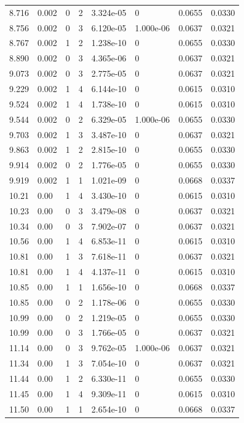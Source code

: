 \documentclass[preview]{standalone}
\begin{document}
{{{\begin{tabular}{L{1.2cm}C{1.2cm} C{0.3cm}C{0.5cm} C{1.4cm}C{1.4cm} C{1.4cm}C{1.4cm}}
  8.716  &  0.002  & 0     &  2 &  3.324e-05  & 0  & 0.0655 &  0.0330   \\ 
  8.756  &  0.002  & 0     &  3 &  6.120e-05  & 1.000e-06  & 0.0637 &  0.0321   \\ 
  8.767  &  0.002  & 1     &  2 &  1.238e-10  & 0  & 0.0655 &  0.0330   \\ 
  8.890  &  0.002  & 0     &  3 &  4.365e-06  & 0  & 0.0637 &  0.0321   \\ 
  9.073  &  0.002  & 0     &  3 &  2.775e-05  & 0  & 0.0637 &  0.0321   \\ 
  9.229  &  0.002  & 1     &  4 &  6.144e-10  & 0  & 0.0615 &  0.0310   \\ 
  9.524  &  0.002  & 1     &  4 &  1.738e-10  & 0  & 0.0615 &  0.0310   \\ 
  9.544  &  0.002  & 0     &  2 &  6.329e-05  & 1.000e-06  & 0.0655 &  0.0330   \\ 
  9.703  &  0.002  & 1     &  3 &  3.487e-10  & 0  & 0.0637 &  0.0321   \\ 
  9.863  &  0.002  & 1     &  2 &  2.815e-10  & 0  & 0.0655 &  0.0330   \\ 
  9.914  &  0.002  & 0     &  2 &  1.776e-05  & 0  & 0.0655 &  0.0330   \\ 
  9.919  &  0.002  & 1     &  1 &  1.021e-09  & 0  & 0.0668 &  0.0337   \\ 
  10.21  &  0.00  & 1     &  4 &  3.430e-10  & 0  & 0.0615 &  0.0310   \\ 
  10.23  &  0.00  & 0     &  3 &  3.479e-08  & 0  & 0.0637 &  0.0321   \\ 
  10.34  &  0.00  & 0     &  3 &  7.902e-07  & 0  & 0.0637 &  0.0321   \\ 
  10.56  &  0.00  & 1     &  4 &  6.853e-11  & 0  & 0.0615 &  0.0310   \\ 
  10.81  &  0.00  & 1     &  3 &  7.618e-11  & 0  & 0.0637 &  0.0321   \\ 
  10.81  &  0.00  & 1     &  4 &  4.137e-11  & 0  & 0.0615 &  0.0310   \\ 
  10.85  &  0.00  & 1     &  1 &  1.656e-10  & 0  & 0.0668 &  0.0337   \\ 
  10.85  &  0.00  & 0     &  2 &  1.178e-06  & 0  & 0.0655 &  0.0330   \\ 
  10.99  &  0.00  & 0     &  2 &  1.219e-05  & 0  & 0.0655 &  0.0330   \\ 
  10.99  &  0.00  & 0     &  3 &  1.766e-05  & 0  & 0.0637 &  0.0321   \\ 
  11.14  &  0.00  & 0     &  3 &  9.762e-05  & 1.000e-06  & 0.0637 &  0.0321   \\ 
  11.34  &  0.00  & 1     &  3 &  7.054e-10  & 0  & 0.0637 &  0.0321   \\ 
  11.44  &  0.00  & 1     &  2 &  6.330e-11  & 0  & 0.0655 &  0.0330   \\ 
  11.45  &  0.00  & 1     &  4 &  9.309e-11  & 0  & 0.0615 &  0.0310   \\ 
  11.50  &  0.00  & 1     &  1 &  2.654e-10  & 0  & 0.0668 &  0.0337   \\ 
\hline 
\end{tabular} 

}}}
\end{document}
